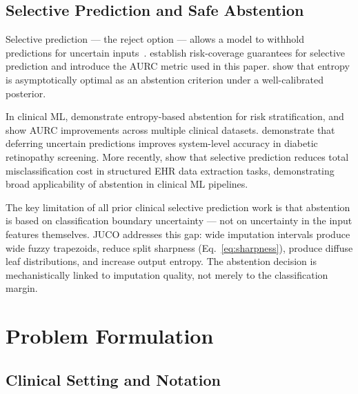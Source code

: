 \documentclass[a4paper,fleqn,longmktitle]{cas-sc}
\begin{document}
	\subsection{Selective Prediction and Safe Abstention}
	\label{sec:rw_selective}
	
	Selective prediction — the reject option — allows a model to
	withhold predictions for uncertain
	inputs~\citep{chow1957optimum, bartlett2008classification}.
	\citet{geifman2017selective} establish risk-coverage guarantees for
	selective prediction and introduce the AURC metric used in this paper.
	\citet{franc2023optimal} show that entropy is asymptotically optimal
	as an abstention criterion under a well-calibrated posterior.
	
	In clinical ML, \citet{jones2021selective} demonstrate entropy-based
	abstention for risk stratification, and \citet{kompa2021second}
	show AURC improvements across multiple clinical datasets.
	\citet{leibig2017leveraging} demonstrate that deferring uncertain
	predictions improves system-level accuracy in diabetic retinopathy
	screening.
	More recently, \citet{swaminathan2024selective} show that
	selective prediction reduces total misclassification cost in
	structured EHR data extraction tasks, demonstrating broad
	applicability of abstention in clinical ML pipelines.
	
	The key limitation of all prior clinical selective prediction work
	is that abstention is based on classification boundary uncertainty —
	not on uncertainty in the input features themselves.
	JUCO addresses this gap: wide imputation intervals produce wide fuzzy
	trapezoids, reduce split sharpness (Eq.~\ref{eq:sharpness}),
	produce diffuse leaf distributions, and increase output entropy.
	The abstention decision is mechanistically linked to imputation
	quality, not merely to the classification margin.
	
	
	
	\section{Problem Formulation}
	\label{sec:problem_formulation}
	
	\subsection{Clinical Setting and Notation}
	\label{sec:notation}
	
\end{document}

